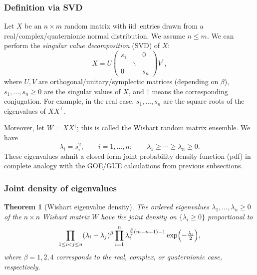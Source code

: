 \documentclass[letterpaper,11pt,oneside,reqno]{article}
\numberwithin{equation}{section}
\newtheorem{theorem}[proposition]{Theorem}
\theoremstyle{definition}
\begin{document}
\subsubsection{Definition via SVD}

Let $X$ be an $n\times m$ random matrix with iid\ entries drawn from a real/complex/quaternionic normal distribution. We assume $n \leq m$.
We can perform the \emph{singular value decomposition} (SVD) of $X$:
\[
    X = U
    \begin{pmatrix}
        s_1 &        & 0 \\
             &\ddots &    \\
         0  &        & s_n
    \end{pmatrix}
    V^\dagger,
\]
where $U,V$ are orthogonal/unitary/symplectic matrices (depending on $\beta$), $s_1,\dots,s_n\geq 0$ are the singular values of $X$, and $\dagger$
means the corresponding conjugation.
For example, in the real case, $s_1,\ldots,s_n $ are
the square roots of the eigenvalues of $X X^\top$.

Moreover, let $W=XX^\dagger$; this is called the Wishart
random matrix ensemble. We have
\[
    \lambda_i = s_i^2,\qquad i=1,\ldots,n;
		\qquad
		\lambda_1\ge \cdots \ge \lambda_n\ge 0.
\]
These eigenvalues admit a closed-form joint probability density function (pdf) in complete analogy with the GOE/GUE calculations from previous subsections.

\subsubsection{Joint density of eigenvalues}

\begin{theorem}[Wishart eigenvalue density]
\label{thm:Wishart-Distribution}
The ordered eigenvalues $\lambda_1,\dots,\lambda_n \geq 0$ of
the $n\times n$ Wishart matrix
$W$ have the joint density on $\{\lambda_i\geq 0\}$ proportional to
\[
    \prod_{1 \leq i < j \leq n}
    (\lambda_i - \lambda_j)^\beta
    \prod_{i=1}^n
    \lambda_i^{\frac{\beta}{2}(m - n + 1)-1}
    \exp\Bigl(-\tfrac{\lambda_i}{2}\Bigr),
\]
where $\beta=1,2,4$ corresponds to the real, complex, or
quaternionic case, respectively.
\end{theorem}
\end{document}
